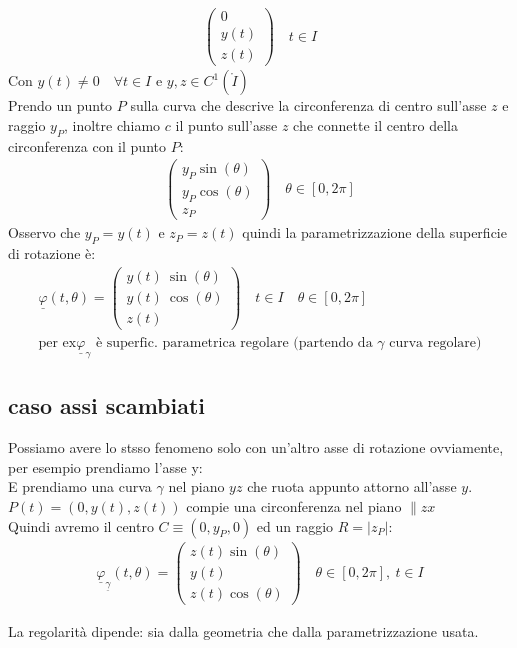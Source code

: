 \documentclass[a4paper, oneside]{article}
\begin{document}
\begin{example}
\begin{gather*}
\begin{pmatrix}
          0\\
          y(t)\\
          z(t)
        \end{pmatrix} \quad t \in I
      \end{gather*}
      Con $y(t) \neq 0 \quad \forall t \in I$ e $y,z \in C^1(\mathring{I})$\\
      Prendo un punto $P$ sulla curva che descrive la circonferenza di centro sull'asse $z$ e raggio $y_P$, inoltre chiamo $c$ il punto sull'asse $z$ che connette il centro della circonferenza con il punto $P$:
      \begin{gather*}
        \begin{pmatrix}
          y_P \sin(\theta)\\
          y_P \cos(\theta)\\
          z_P
        \end{pmatrix} \quad \theta \in [0,2\pi]
      \end{gather*}
      Osservo che $y_P = y(t)$ e $z_P = z(t)$ quindi la parametrizzazione della superficie di rotazione è:
      \begin{gather*}
        \underline{\varphi}(t,\theta) = \begin{pmatrix}
          y(t) \ \sin(\theta)\\
          y(t) \ \cos(\theta)\\
          z(t)
        \end{pmatrix} \quad t \in I \quad \theta \in [0,2\pi]\\
        \text{per ex} \underline{\varphi}_\gamma \text{ è superfic. parametrica regolare (partendo da $\gamma$ curva regolare)}
      \end{gather*}
    \end{example}
  \subsection{caso assi scambiati}
  Possiamo avere lo stsso fenomeno solo con un'altro asse di rotazione ovviamente, per esempio prendiamo l'asse y:\\
  E prendiamo una curva $\gamma$ nel piano $yz$ che ruota appunto attorno all'asse $y$.\\
  $P(t) = (0,y(t), z(t))$ compie una circonferenza nel piano $\parallel zx$\\
  Quindi avremo il centro $C \equiv (0, y_P, 0)$ ed un raggio $R = |z_P|$:
  \begin{gather*}
    \underline{\varphi}_{\underline{\gamma}} (t, \theta) = \begin{pmatrix}
      z(t) \sin(\theta)\\
      y(t)\\
      z(t) \cos(\theta)
    \end{pmatrix} \quad \theta \in [0,2\pi], \ t \in I
  \end{gather*}
\begin{observation}
La regolarità dipende: sia dalla geometria che dalla parametrizzazione usata.
\end{observation}
\end{document}
